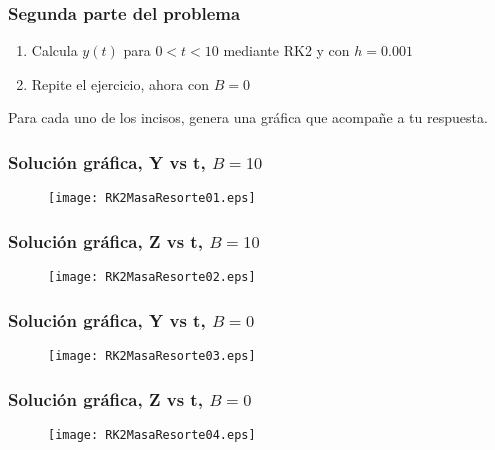 \begin{frame}
\frametitle{Segunda parte del problema}
\begin{enumerate}
\item Calcula $y(t)$ para $0<t<10$ mediante RK2 y con $h=0.001$
\item Repite el ejercicio, ahora con $B=0$
\end{enumerate}
Para cada uno de los incisos, genera una gr\'{a}fica que acompañe a tu respuesta.
\end{frame}
\begin{frame}[fragile]
\frametitle{Soluci\'{o}n gr\'{a}fica, Y vs t, $B=10$ }
\begin{figure}
	\centering
	\texttt{[image: RK2MasaResorte01.eps]} 
\end{figure}
\end{frame}
\begin{frame}[fragile]
\frametitle{Soluci\'{o}n gr\'{a}fica, Z vs t, $B=10$}
\begin{figure}
	\centering
	\texttt{[image: RK2MasaResorte02.eps]} 
\end{figure}
\end{frame}
\begin{frame}[fragile]
\frametitle{Soluci\'{o}n gr\'{a}fica, Y vs t, $B=0$ }
\begin{figure}
	\centering
	\texttt{[image: RK2MasaResorte03.eps]} 
\end{figure}
\end{frame}
\begin{frame}[fragile]
\frametitle{Soluci\'{o}n gr\'{a}fica, Z vs t, $B=0$}
\begin{figure}
	\centering
	\texttt{[image: RK2MasaResorte04.eps]} 
\end{figure}
\end{frame}
